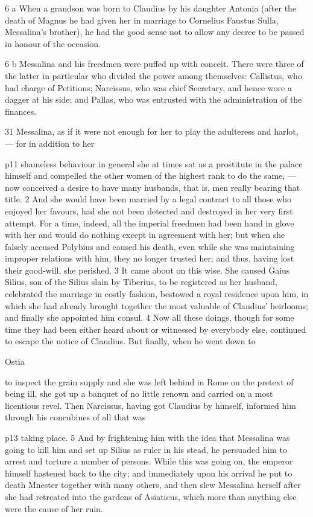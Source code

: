 6 a
When a grandson was born to Claudius by his daughter Antonia (after the death of Magnus he had given her in marriage to Cornelius Faustus Sulla, Messalina's brother), he had the good sense not to allow any decree to be passed in honour of the occasion.

6 b
Messalina and his freedmen were puffed up with conceit. There were three of the latter in particular who divided the power among themselves: Callistus, who had charge of Petitions; Narcissus, who was chief Secretary, and hence wore a dagger at his side; and Pallas, who was entrusted with the administration of the finances.

31
Messalina, as if it were not enough for her to play the adulteress and harlot, \texthebrew{—} for in addition to her

p11 shameless behaviour in general she at times sat as a prostitute in the palace himself and compelled the other women of the highest rank to do the same, \texthebrew{—} now conceived a desire to have many husbands, that is, men really bearing that title. 2 And she would have been married by a legal contract to all those who enjoyed her favours, had she not been detected and destroyed in her very first attempt. For a time, indeed, all the imperial freedmen had been hand in glove with her and would do nothing except in agreement with her; but when she falsely accused Polybius and caused his death, even while she was maintaining improper relations with him, they no longer trusted her; and thus, having lost their good-will, she perished. 3 It came about on this wise. She caused Gaius Silius, son of the Silius slain by Tiberius, to be registered as her husband, celebrated the marriage in costly fashion, bestowed a royal residence upon him, in which she had already brought together the most valuable of Claudius' heirlooms; and finally she appointed him consul. 4 Now all these doings, though for some time they had been either heard about or witnessed by everybody else, continued to escape the notice of Claudius. But finally, when he went down to

Ostia

to inspect the grain supply and she was left behind in Rome on the pretext of being ill, she got up a banquet of no little renown and carried on a most licentious revel. Then Narcissus, having got Claudius by himself, informed him through his concubines of all that was

p13 taking place. 5 And by frightening him with the idea that Messalina was going to kill him and set up Silius as ruler in his stead, he persuaded him to arrest and torture a number of persons. While this was going on, the emperor himself hastened back to the city; and immediately upon his arrival he put to death Mnester together with many others, and then slew Messalina herself after she had retreated into the gardens of Asiaticus, which more than anything else were the cause of her ruin.

